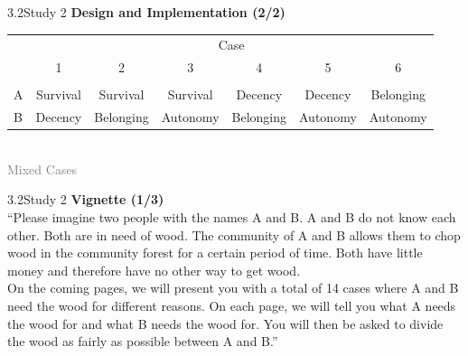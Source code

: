 \documentclass[xcolor=table,9pt,aspectratio=169]{beamer}
\begin{document}
\begin{frame}{\vspace*{10mm}3.2\hspace*{1em}Study 2}
\textbf{Design and Implementation (2/2)}\\
\medskip
\begin{center}
   \begin{tabular}{lcccccc}
      \arrayrulecolor{blue2}
      \hline
                 & \multicolumn{6}{c}{Case}                                                       \\
                 & 1          & 2           & 3          & 4           & 5          & 6           \\
      \hline\hline\\[-0.5em]
      A          & Survival   & Survival    & Survival   & Decency     & Decency    & Belonging   \\
      B          & Decency    & Belonging   & Autonomy   & Belonging   & Autonomy   & Autonomy    \\
      \hline
   \end{tabular}\\
   \smallskip
   \textcolor{gray}{Mixed Cases}
\end{center}
\end{frame}


\begin{frame}{\vspace*{10mm}3.2\hspace*{1em}Study 2}
\textbf{Vignette (1/3)}\\
\medskip
\enquote{Please imagine two people with the names A and B.
A and B do not know each other.
Both are in need of wood.
The community of A and B allows them to chop wood in the community forest for a certain period of time.
Both have little money and therefore have no other way to get wood.\\
\medskip
On the coming pages, we will present you with a total of 14 cases where A and B need the wood for different reasons.
On each page, we will tell you what A needs the wood for and what B needs the wood for.
You will then be asked to divide the wood as fairly as possible between A and B.}
\end{frame}
\end{document}
